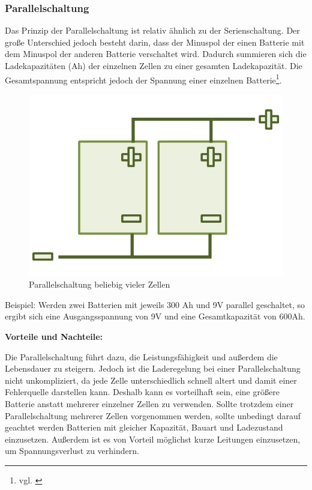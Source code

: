 \subsubsection{Parallelschaltung}
Das Prinzip der Parallelschaltung ist relativ ähnlich zu der Serienschaltung. Der große Unterschied jedoch besteht darin, dass der Minuspol der einen Batterie mit dem Minuspol der anderen Batterie verschaltet wird. Dadurch summieren sich die Ladekapazitäten (Ah) der einzelnen Zellen zu einer gesamten Ladekapazität. Die Gesamtspannung entspricht jedoch der Spannung einer einzelnen Batterie\footnote{vgl. \cite{Parallelsch}}.

\begin{figure}[H]
	\begin{center}
		\includegraphics[scale=1.0]{figures/Akku/ParallelschaltungzweierBatterien.org.jpg}
		\caption{Parallelschaltung beliebig vieler Zellen\cite{ParallelschaltungZellen}}
		\label{fig: Parallelschaltung beliebig vieler Zellen}
	\end{center}
\end{figure}

Beispiel: Werden zwei Batterien mit jeweils 300 Ah und 9V parallel geschaltet, so ergibt sich eine Ausgangsspannung von 9V und eine Gesamtkapazität von 600Ah. \medskip

\textbf{Vorteile und Nachteile:}

Die Parallelschaltung führt dazu, die Leistungsfähigkeit und außerdem die Lebensdauer zu steigern. Jedoch ist die Laderegelung bei einer Parallelschaltung nicht unkompliziert, da jede Zelle unterschiedlich schnell altert und damit einer Fehlerquelle darstellen kann. Deshalb kann es vorteilhaft sein, eine größere Batterie anstatt mehrerer einzelner Zellen zu verwenden. Sollte trotzdem einer Parallelschaltung mehrerer Zellen vorgenommen werden, sollte unbedingt darauf geachtet werden Batterien mit gleicher  Kapazität, Bauart und Ladezustand einzusetzen. Außerdem ist es von Vorteil möglichst kurze Leitungen einzusetzen, um Spannungsverlust zu verhindern.
\newpage

